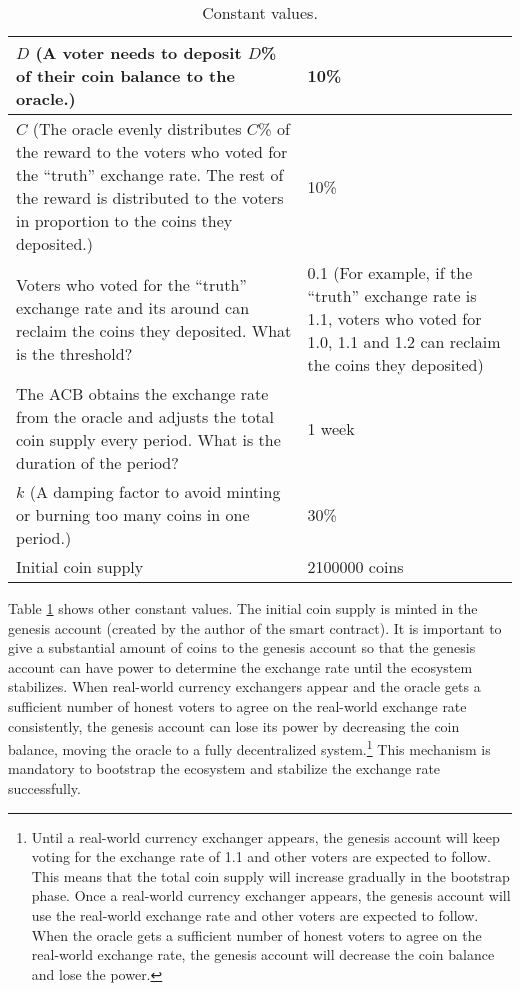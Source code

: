 \documentclass[dvipdfmx,a4paper]{article}
\begin{document}
\begin{table}[htb]
\begin{center}
\caption{Constant values.}\vspace{2ex}
\begin{tabular}{p{26em}|p{10em}}\hline
$D$ (A voter needs to deposit $D$\% of their coin balance to the oracle.) & 10\%\\\hline
$C$ (The oracle evenly distributes $C$\% of the reward to the voters who voted for the ``truth'' exchange rate. The rest of the reward is distributed to the voters in proportion to the coins they deposited.) & 10\%\\\hline
Voters who voted for the ``truth'' exchange rate and its around can reclaim the coins they deposited. What is the threshold? & 0.1 (For example, if the ``truth'' exchange rate is 1.1, voters who voted for 1.0, 1.1 and 1.2 can reclaim the coins they deposited)\\\hline
The ACB obtains the exchange rate from the oracle and adjusts the total coin supply every period. What is the duration of the period? & 1 week\\\hline
$k$ (A damping factor to avoid minting or burning too many coins in one period.) & 30\%\\\hline
Initial coin supply & 2100000 coins\\\hline
\end{tabular}
\label{table2}
\end{center}
\end{table}

Table \ref{table2} shows other constant values. The initial coin supply is minted in the genesis account (created by the author of the smart contract). It is important to give a substantial amount of coins to the genesis account so that the genesis account can have power to determine the exchange rate until the ecosystem stabilizes. When real-world currency exchangers appear and the oracle gets a sufficient number of honest voters to agree on the real-world exchange rate consistently, the genesis account can lose its power by decreasing the coin balance, moving the oracle to a fully decentralized system.\footnote{Until a real-world currency exchanger appears, the genesis account will keep voting for the exchange rate of 1.1 and other voters are expected to follow. This means that the total coin supply will increase gradually in the bootstrap phase. Once a real-world currency exchanger appears, the genesis account will use the real-world exchange rate and other voters are expected to follow. When the oracle gets a sufficient number of honest voters to agree on the real-world exchange rate, the genesis account will decrease the coin balance and lose the power.} This mechanism is mandatory to bootstrap the ecosystem and stabilize the exchange rate successfully.
\end{document}
